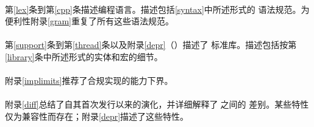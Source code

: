 \paragraph{} %
第\ref{lex}条到第\ref{cpp}条描述\cpp{}编程语言。描述包括\ref{syntax}中所述形式的
语法规范。为便利性附录\ref{gram}重复了所有这些语法规范。

\paragraph{} %
第\ref{support}条到第\ref{thread}条以及附录\ref{depr}（）描述了
\cpp{}标准库。描述包括按第\ref{library}条中所述形式的实体和宏的细节。

\paragraph{} %
附录\ref{implimits}推荐了合规实现的能力下界。

\paragraph{} %
附录\ref{diff}总结了自其首次发行以来\cpp{}的演化，并详细解释了\cpp{}与\c{}之间的
差别。某些\cpp{}特性仅为兼容性而存在；附录\ref{depr}描述了这些特性。
